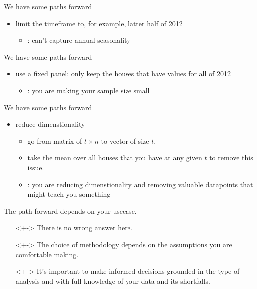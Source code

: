 \documentclass{beamer}
\begin{document}
\begin{frame}{We have some paths forward}
  \begin{itemize}
    \item<+-> limit the timeframe to, for example, latter half of 2012
    \begin{itemize}
      \item<+-> {\color{red}{con}}: can't capture annual seasonality
    \end{itemize}
  \end{itemize}
\end{frame}

\begin{frame}{We have some paths forward}
  \begin{itemize}
    \item<+-> use a fixed panel: only keep the houses that have values for all of 2012
    \begin{itemize}
      \item<+-> {\color{red}{con}}: you are making your sample size small
    \end{itemize}
  \end{itemize}
\end{frame}

\begin{frame}{We have some paths forward}
  \begin{itemize}
    \item<+-> reduce dimenstionality
    \begin{itemize}
      \item<+-> go from matrix of $t \times n$ to vector of size $t$.
      \item<+-> take the mean over all houses that you have at any given $t$ to remove this issue.
      \item<+-> {\color{red}{con}}: you are reducing dimenstionality and removing valuable datapoints that might teach you something
    \end{itemize}
  \end{itemize}
\end{frame}

\begin{frame}{The path forward depends on your usecase.}
  \begin{itemize}
    \item[]<+-> There is no wrong answer here. 
    \item[]<+-> The choice of methodology depends on the assumptions you are comfortable making.
    \item[]<+-> It's important to make informed decisions grounded in the type of analysis and with full knowledge of your data and its shortfalls.
  \end{itemize}
\end{frame}
\end{document}
